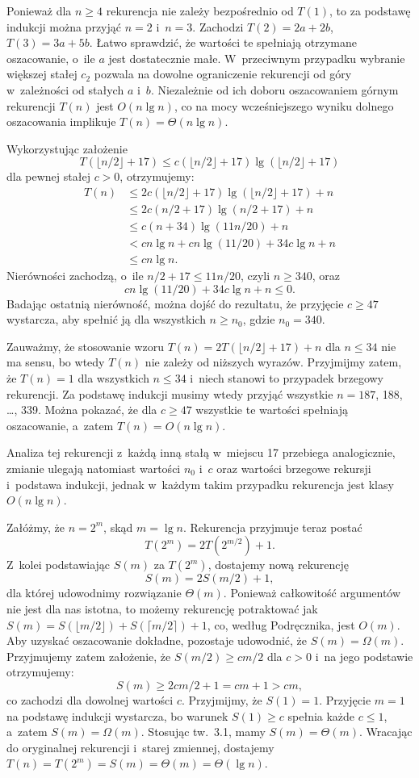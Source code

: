 Ponieważ dla $n\ge4$ rekurencja nie zależy bezpośrednio od $T(1)$, to za podstawę indukcji można przyjąć $n=2$ i~$n=3$.
Zachodzi $T(2)=2a+2b$, $T(3)=3a+5b$.
Łatwo sprawdzić, że wartości te spełniają otrzymane oszacowanie, o~ile $a$ jest dostatecznie małe.
W~przeciwnym przypadku wybranie większej stałej $c_2$ pozwala na dowolne ograniczenie rekurencji od góry w~zależności od stałych $a$ i~$b$.
Niezależnie od ich doboru oszacowaniem górnym rekurencji $T(n)$ jest $O(n\lg n)$, co na mocy wcześniejszego wyniku dolnego oszacowania implikuje $T(n)=\Theta(n\lg n)$.

\exercise %
Wykorzystując założenie
\[
	T(\lfloor n/2\rfloor+17) \le c(\lfloor n/2\rfloor+17)\lg(\lfloor n/2\rfloor+17)
\]
dla pewnej stałej $c>0$, otrzymujemy:
\begin{align*}
	T(n) &\le 2c(\lfloor n/2\rfloor+17)\lg(\lfloor n/2\rfloor+17)+n \\
	&\le 2c(n/2+17)\lg(n/2+17)+n \\
	&\le c(n+34)\lg(11n/20)+n \\
	&< cn\lg n+cn\lg(11/20)+34c\lg n+n \\
	&\le cn\lg n.
\end{align*}
Nierówności zachodzą, o~ile $n/2+17\le 11n/20$, czyli $n\ge340$, oraz
\[
	cn\lg(11/20)+34c\lg n+n \le 0.
\]
Badając ostatnią nierówność, można dojść do rezultatu, że przyjęcie $c\ge47$ wystarcza, aby spełnić ją dla wszystkich $n\ge n_0$, gdzie $n_0=340$.

Zauważmy, że stosowanie wzoru $T(n)=2T(\lfloor n/2\rfloor+17)+n$ dla $n\le34$ nie ma sensu, bo wtedy $T(n)$ nie zależy od niższych wyrazów.
Przyjmijmy zatem, że $T(n)=1$ dla wszystkich $n\le34$ i~niech stanowi to przypadek brzegowy rekurencji.
Za podstawę indukcji musimy wtedy przyjąć wszystkie $n=187$, 188, \dots, 339.
Można pokazać, że dla $c\ge47$ wszystkie te wartości spełniają oszacowanie, a~zatem $T(n)=O(n\lg n)$.

Analiza tej rekurencji z~każdą inną stałą w~miejscu 17 przebiega analogicznie, zmianie ulegają natomiast wartości $n_0$ i~$c$ oraz wartości brzegowe rekursji i~podstawa indukcji, jednak w~każdym takim przypadku rekurencja jest klasy $O(n\lg n)$.

\exercise %
Załóżmy, że $n=2^m$, skąd $m=\lg n$.
Rekurencja przyjmuje teraz postać
\[
	T(2^m) = 2T(2^{m/2})+1.
\]
Z~kolei podstawiając $S(m)$ za $T(2^m)$, dostajemy nową rekurencję
\[
	S(m) = 2S(m/2)+1,
\]
dla której udowodnimy rozwiązanie $\Theta(m)$.
Ponieważ całkowitość argumentów nie jest dla nas istotna, to możemy rekurencję potraktować jak $S(m)=S(\lfloor m/2\rfloor)+S(\lceil m/2\rceil)+1$, co, według Podręcznika, jest $O(m)$.
Aby uzyskać oszacowanie dokładne, pozostaje udowodnić, że $S(m)=\Omega(m)$.
Przyjmujemy zatem założenie, że $S(m/2)\ge cm/2$ dla $c>0$ i~na jego podstawie otrzymujemy:
\[
	S(m) \ge 2cm/2+1 = cm+1 > cm,
\]
co zachodzi dla dowolnej wartości $c$.
Przyjmijmy, że $S(1)=1$.
Przyjęcie $m=1$ na podstawę indukcji wystarcza, bo warunek $S(1)\ge c$ spełnia każde $c\le1$, a~zatem $S(m)=\Omega(m)$.
Stosując tw.\ 3.1, mamy $S(m)=\Theta(m)$.
Wracając do oryginalnej rekurencji i~starej zmiennej, dostajemy $T(n)=T(2^m)=S(m)=\Theta(m)=\Theta(\lg n)$.
